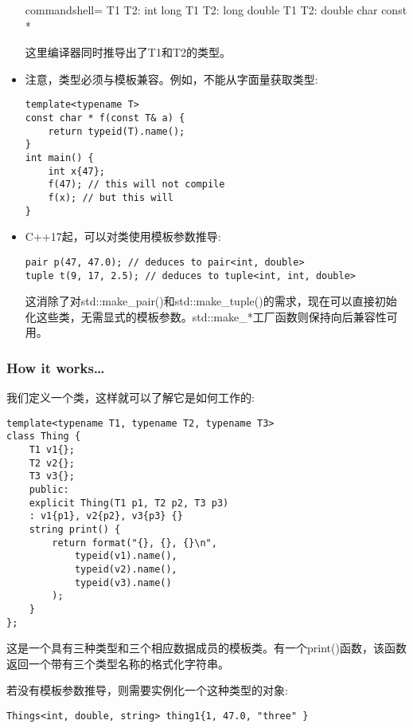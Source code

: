 \begin{itemize}
\begin{tcblisting}{commandshell={}}
T1 T2: int long
T1 T2: long double
T1 T2: double char const *
\end{tcblisting}

这里编译器同时推导出了T1和T2的类型。

\item 
注意，类型必须与模板兼容。例如，不能从字面量获取类型:

\begin{lstlisting}[style=styleCXX]
template<typename T>
const char * f(const T& a) {
	return typeid(T).name();
}
int main() {
	int x{47};
	f(47); // this will not compile
	f(x); // but this will
}
\end{lstlisting}

\item 
C++17起，可以对类使用模板参数推导:

\begin{lstlisting}[style=styleCXX]
pair p(47, 47.0); // deduces to pair<int, double>
tuple t(9, 17, 2.5); // deduces to tuple<int, int, double>
\end{lstlisting}

这消除了对std::make\_pair()和std::make\_tuple()的需求，现在可以直接初始化这些类，无需显式的模板参数。std::make\_*工厂函数则保持向后兼容性可用。
\end{itemize}

\subsubsection{How it works…}

我们定义一个类，这样就可以了解它是如何工作的:

\begin{lstlisting}[style=styleCXX]
template<typename T1, typename T2, typename T3>
class Thing {
	T1 v1{};
	T2 v2{};
	T3 v3{};
	public:
	explicit Thing(T1 p1, T2 p2, T3 p3)
	: v1{p1}, v2{p2}, v3{p3} {}
	string print() {
		return format("{}, {}, {}\n",
			typeid(v1).name(),
			typeid(v2).name(),
			typeid(v3).name()
		);
	}
};
\end{lstlisting}

这是一个具有三种类型和三个相应数据成员的模板类。有一个print()函数，该函数返回一个带有三个类型名称的格式化字符串。

若没有模板参数推导，则需要实例化一个这种类型的对象:

\begin{lstlisting}[style=styleCXX]
Things<int, double, string> thing1{1, 47.0, "three" }
\end{lstlisting}

